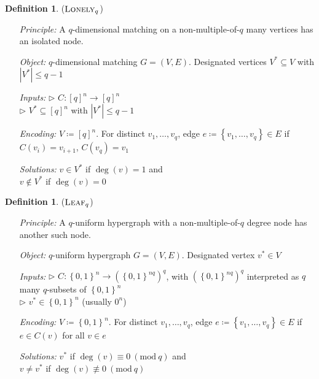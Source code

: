 \documentclass[10pt,a4paper]{article}
\theoremstyle{definition}
\newtheorem{definition}[theorem]{Definition}
\theoremstyle{remark}
\newcommand{\contour}[2]{#2}
\newcommand{\inparen}[1]{\left ( #1 \right )}
\renewcommand{\mod}[1]{~\inparen{\mathrm{mod}~#1}}
\def\set#1{\left\{#1\right\}}
\newcommand{\bit}{\ensuremath{\set{0,1}}}
\newcommand{\leaf}{\ensuremath\textsc{Leaf}}
\newcommand{\lonely}{\ensuremath\textsc{Lonely}}
\begin{document}
\noindent
\begin{minipage}{\linewidth}
\begin{definition}
	\label{def:lonely} \contour{black}{($\lonely_q$)}\vspace{-5pt}
	\begin{itemize}[leftmargin=2.15cm,itemsep=4pt]
		\item[\slshape Principle:] A $q$-dimensional matching on a non-multiple-of-$q$ many vertices has an isolated node.
		\item[\slshape Object:] $q$-dimensional matching $G = (V, E)$. Designated vertices $V^* \subseteq V$ with $|V^*| \le q-1$
		\item[\slshape Inputs:] $\triangleright$ $C:[q]^n \to [q]^n$\\
	$\triangleright$ $V^* \subseteq [q]^n$ with $|V^*| \le q-1$
		\item[\slshape Encoding:] $V\coloneqq[q]^n$. For distinct $v_1, \ldots, v_q$, edge $e\coloneqq\set{v_1, \ldots, v_q}\in E$ if $C(v_i) = v_{i+1}$, $C(v_q) = v_1$
		\item[\slshape Solutions:] $v \in V^*$ if $\deg(v) = 1$ and\\
	$v \notin V^*$ if $\deg(v) = 0$
	\end{itemize}
\end{definition}
\end{minipage}\vspace{5mm}



\noindent
\begin{minipage}{\linewidth}
\begin{definition}
	\label{def:leaf} \contour{black}{($\leaf_q$)}\vspace{-5pt}
	\begin{itemize}[leftmargin=2.15cm,itemsep=4pt]
		\item[\slshape Principle:] A $q$-uniform hypergraph with a non-multiple-of-$q$ degree node has another such node.
		\item[\slshape Object:] $q$-uniform hypergraph $G = (V, E)$. Designated vertex $v^* \in V$
		\item[\slshape Inputs:] $\triangleright$ $C:\bit^n \to (\bit^{nq})^q$, with $(\bit^{nq})^q$ interpreted as $q$ many $q$-subsets of $\bit^n$\\
	$\triangleright$ $v^* \in \bit^n$ (usually $0^n$)
		\item[\slshape Encoding:] $V\coloneqq\bit^n$. For distinct $v_1, \ldots, v_q$, edge $e\coloneqq\set{v_1, \ldots, v_q}\in E$ if $e \in C(v)$ for all $v \in e$
		\item[\slshape Solutions:] $v^*$ if $\deg(v) \equiv 0 \mod{q}$ and\\
	$v \ne v^*$ if $\deg(v) \not\equiv 0 \mod{q}$
	\end{itemize}
\end{definition}
\end{minipage}\vspace{5mm}
\end{document}
